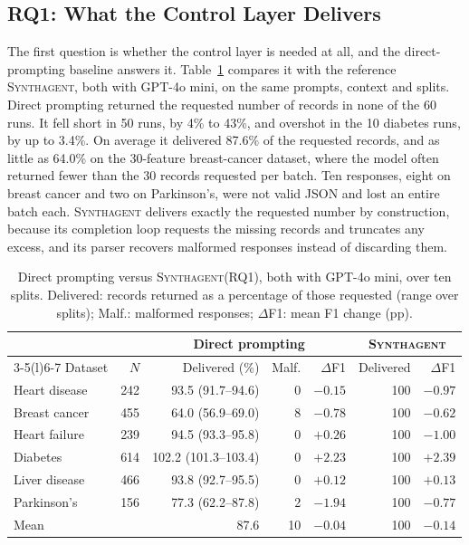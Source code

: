 \documentclass[conference]{IEEEtran}
\newcommand{\system}{\textsc{Synthagent}\xspace}
\begin{document}
\subsection{RQ1: What the Control Layer Delivers}
\label{sec:rq1}
The first question is whether the control layer is needed at all, and the direct-prompting baseline answers it. Table~\ref{tab:raw} compares it with the reference \system, both with GPT-4o mini, on the same prompts, context and splits. Direct prompting returned the requested number of records in none of the 60 runs. It fell short in 50 runs, by 4\% to 43\%, and overshot in the 10 diabetes runs, by up to 3.4\%. On average it delivered 87.6\% of the requested records, and as little as 64.0\% on the 30-feature breast-cancer dataset, where the model often returned fewer than the 30 records requested per batch. Ten responses, eight on breast cancer and two on Parkinson's, were not valid JSON and lost an entire batch each. \system delivers exactly the requested number by construction, because its completion loop requests the missing records and truncates any excess, and its parser recovers malformed responses instead of discarding them.

\begin{table}[t]
\centering
\caption{Direct prompting versus \system (RQ1), both with GPT-4o mini, over ten splits. Delivered: records returned as a percentage of those requested (range over splits); Malf.: malformed responses; $\Delta$F1: mean F1 change (pp).}
\label{tab:raw}
\scriptsize
\setlength{\tabcolsep}{2pt}
\begin{tabular*}{\columnwidth}{@{\extracolsep{\fill}}lrrrrrr@{}}
\toprule
& & \multicolumn{3}{c}{Direct prompting} & \multicolumn{2}{c}{\system} \\
\cmidrule(lr){3-5}\cmidrule(l){6-7}
Dataset & $N$ & Delivered (\%) & Malf. & $\Delta$F1 & Delivered & $\Delta$F1 \\
\midrule
Heart disease & 242 & 93.5 (91.7--94.6) & 0 & $-0.15$ & 100 & $-0.97$ \\
Breast cancer & 455 & 64.0 (56.9--69.0) & 8 & $-0.78$ & 100 & $-0.62$ \\
Heart failure & 239 & 94.5 (93.3--95.8) & 0 & $+0.26$ & 100 & $-1.00$ \\
Diabetes & 614 & 102.2 (101.3--103.4) & 0 & $+2.23$ & 100 & $+2.39$ \\
Liver disease & 466 & 93.8 (92.7--95.5) & 0 & $+0.12$ & 100 & $+0.13$ \\
Parkinson's & 156 & 77.3 (62.2--87.8) & 2 & $-1.94$ & 100 & $-0.77$ \\
\midrule
Mean & & 87.6 & 10 & $-0.04$ & 100 & $-0.14$ \\
\bottomrule
\end{tabular*}
\end{table}
\end{document}

